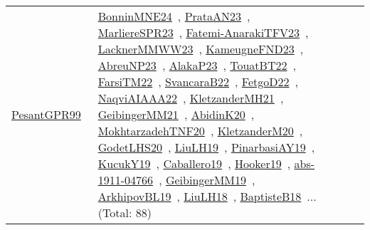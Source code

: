 {\begin{longtable}{lp{3cm}>{\raggedright\arraybackslash}p{6cm}>{\raggedright\arraybackslash}p{6cm}>{\raggedright\arraybackslash}p{8cm}}
\href{../works/PesantGPR99.pdf}{PesantGPR99}~\cite{PesantGPR99} & \href{../works/BonninMNE24.pdf}{BonninMNE24}~\cite{BonninMNE24}, \href{../works/PrataAN23.pdf}{PrataAN23}~\cite{PrataAN23}, \href{../works/MarliereSPR23.pdf}{MarliereSPR23}~\cite{MarliereSPR23}, \href{../works/Fatemi-AnarakiTFV23.pdf}{Fatemi-AnarakiTFV23}~\cite{Fatemi-AnarakiTFV23}, \href{../works/LacknerMMWW23.pdf}{LacknerMMWW23}~\cite{LacknerMMWW23}, \href{../works/KameugneFND23.pdf}{KameugneFND23}~\cite{KameugneFND23}, \href{../works/AbreuNP23.pdf}{AbreuNP23}~\cite{AbreuNP23}, \href{../works/AlakaP23.pdf}{AlakaP23}~\cite{AlakaP23}, \href{../works/TouatBT22.pdf}{TouatBT22}~\cite{TouatBT22}, \href{../works/FarsiTM22.pdf}{FarsiTM22}~\cite{FarsiTM22}, \href{../works/SvancaraB22.pdf}{SvancaraB22}~\cite{SvancaraB22}, \href{../works/FetgoD22.pdf}{FetgoD22}~\cite{FetgoD22}, \href{../works/NaqviAIAAA22.pdf}{NaqviAIAAA22}~\cite{NaqviAIAAA22}, \href{../works/KletzanderMH21.pdf}{KletzanderMH21}~\cite{KletzanderMH21}, \href{../works/GeibingerMM21.pdf}{GeibingerMM21}~\cite{GeibingerMM21}, \href{../works/AbidinK20.pdf}{AbidinK20}~\cite{AbidinK20}, \href{../works/MokhtarzadehTNF20.pdf}{MokhtarzadehTNF20}~\cite{MokhtarzadehTNF20}, \href{../works/KletzanderM20.pdf}{KletzanderM20}~\cite{KletzanderM20}, \href{../works/GodetLHS20.pdf}{GodetLHS20}~\cite{GodetLHS20}, \href{../works/LiuLH19.pdf}{LiuLH19}~\cite{LiuLH19}, \href{../works/PinarbasiAY19.pdf}{PinarbasiAY19}~\cite{PinarbasiAY19}, \href{../works/KucukY19.pdf}{KucukY19}~\cite{KucukY19}, \href{../works/Caballero19.pdf}{Caballero19}~\cite{Caballero19}, \href{../works/Hooker19.pdf}{Hooker19}~\cite{Hooker19}, \href{../works/abs-1911-04766.pdf}{abs-1911-04766}~\cite{abs-1911-04766}, \href{../works/GeibingerMM19.pdf}{GeibingerMM19}~\cite{GeibingerMM19}, \href{../works/ArkhipovBL19.pdf}{ArkhipovBL19}~\cite{ArkhipovBL19}, \href{../works/LiuLH18.pdf}{LiuLH18}~\cite{LiuLH18}, \href{../works/BaptisteB18.pdf}{BaptisteB18}~\cite{BaptisteB18}... (Total: 88)\\
\end{longtable}
}

